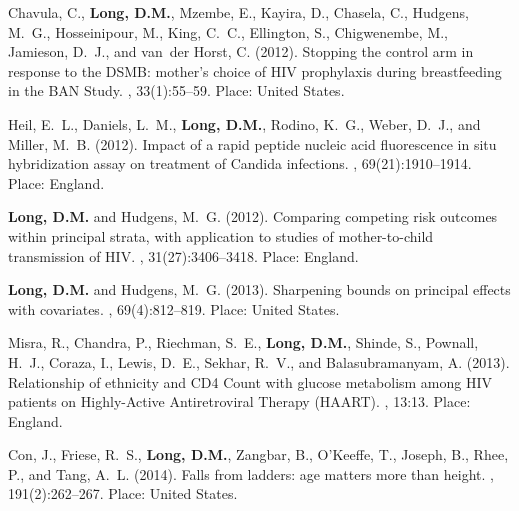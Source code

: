 \begin{thebibliography}{}

Chavula, C., \textbf{Long, D.M.}, Mzembe, E., Kayira, D., Chasela, C., Hudgens, M.~G.,
  Hosseinipour, M., King, C.~C., Ellington, S., Chigwenembe, M., Jamieson,
  D.~J., and van~der Horst, C. (2012).
\newblock Stopping the control arm in response to the {DSMB}: mother's choice
  of {HIV} prophylaxis during breastfeeding in the {BAN} {Study}.
, 33(1):55--59.
\newblock Place: United States.

Heil, E.~L., Daniels, L.~M., \textbf{Long, D.M.}, Rodino, K.~G., Weber, D.~J., and
  Miller, M.~B. (2012).
\newblock Impact of a rapid peptide nucleic acid fluorescence in situ
  hybridization assay on treatment of {Candida} infections.
,
  69(21):1910--1914.
\newblock Place: England.

\textbf{Long, D.M.} and Hudgens, M.~G. (2012).
\newblock Comparing competing risk outcomes within principal strata, with
  application to studies of mother-to-child transmission of {HIV}.
, 31(27):3406--3418.
\newblock Place: England.

\textbf{Long, D.M.} and Hudgens, M.~G. (2013).
\newblock Sharpening bounds on principal effects with covariates.
, 69(4):812--819.
\newblock Place: United States.

Misra, R., Chandra, P., Riechman, S.~E., \textbf{Long, D.M.}, Shinde, S., Pownall,
  H.~J., Coraza, I., Lewis, D.~E., Sekhar, R.~V., and Balasubramanyam, A.
  (2013).
\newblock Relationship of ethnicity and {CD4} {Count} with glucose metabolism
  among {HIV} patients on {Highly}-{Active} {Antiretroviral} {Therapy}
  ({HAART}).
, 13:13.
\newblock Place: England.

Con, J., Friese, R.~S., \textbf{Long, D.M.}, Zangbar, B., O'Keeffe, T., Joseph, B.,
  Rhee, P., and Tang, A.~L. (2014).
\newblock Falls from ladders: age matters more than height.
, 191(2):262--267.
\newblock Place: United States.


\end{thebibliography}
